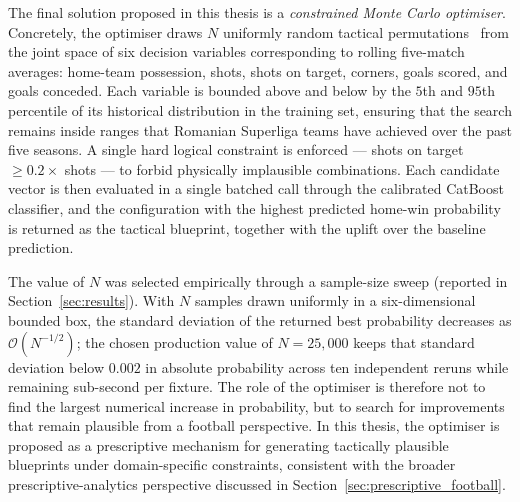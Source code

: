 The final solution proposed in this thesis is a \emph{constrained Monte Carlo optimiser}. Concretely, the optimiser draws $N$ uniformly random tactical permutations~\cite{robert2004monte,bergstra2012random} from the joint space of six decision variables corresponding to rolling five-match averages: home-team possession, shots, shots on target, corners, goals scored, and goals conceded. Each variable is bounded above and below by the $5$th and $95$th percentile of its historical distribution in the training set, ensuring that the search remains inside ranges that Romanian Superliga teams have achieved over the past five seasons. A single hard logical constraint is enforced --- shots on target $\geq 0.2 \times$ shots --- to forbid physically implausible combinations. Each candidate vector is then evaluated in a single batched call through the calibrated CatBoost classifier, and the configuration with the highest predicted home-win probability is returned as the tactical blueprint, together with the uplift over the baseline prediction.

The value of $N$ was selected empirically through a sample-size sweep (reported in Section~\ref{sec:results}). With $N$ samples drawn uniformly in a six-dimensional bounded box, the standard deviation of the returned best probability decreases as $\mathcal{O}(N^{-1/2})$; the chosen production value of $N=25{,}000$ keeps that standard deviation below $0.002$ in absolute probability across ten independent reruns while remaining sub-second per fixture. The role of the optimiser is therefore not to find the largest numerical increase in probability, but to search for improvements that remain plausible from a football perspective. In this thesis, the optimiser is proposed as a prescriptive mechanism for generating tactically plausible blueprints under domain-specific constraints, consistent with the broader prescriptive-analytics perspective discussed in Section~\ref{sec:prescriptive_football}.

